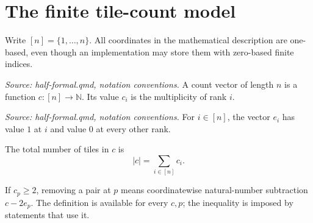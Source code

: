 \chapter{The finite tile-count model}

Write \([n]=\{1,\ldots,n\}\).  All coordinates in the mathematical
description are one-based, even though an implementation may store them with
zero-based finite indices.

\begin{definition}
  \label{def:counts}
  \textit{Source: half-formal.qmd, notation conventions.}
  A count vector of length \(n\) is a function \(c:[n]\to\mathbb N\).
  Its value \(c_i\) is the multiplicity of rank \(i\).
\end{definition}

\begin{definition}
  \label{def:basis}
  \textit{Source: half-formal.qmd, notation conventions.}
  For \(i\in[n]\), the vector \(e_i\) has value \(1\) at \(i\) and
  value \(0\) at every other rank.
\end{definition}

\begin{definition}
  \label{def:total}
  The total number of tiles in \(c\) is
  \[
    |c|=\sum_{i\in[n]}c_i.
  \]
\end{definition}

\begin{definition}
  \label{def:remove_pair}
  If \(c_p\geq 2\), removing a pair at \(p\) means coordinatewise
  natural-number subtraction \(c-2e_p\).  The definition is available for
  every \(c,p\); the inequality is imposed by statements that use it.
\end{definition}

